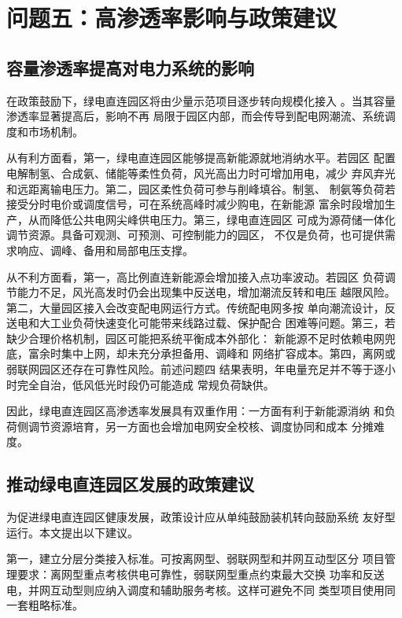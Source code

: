 \section{问题五：高渗透率影响与政策建议}

\subsection{容量渗透率提高对电力系统的影响}

在政策鼓励下，绿电直连园区将由少量示范项目逐步转向规模化接入
\cite{ndrc2025green-direct}。当其容量渗透率显著提高后，影响不再
局限于园区内部，而会传导到配电网潮流、系统调度和市场机制。

从有利方面看，第一，绿电直连园区能够提高新能源就地消纳水平。若园区
配置电解制氢、合成氨、储能等柔性负荷，风光高出力时可增加用电，减少
弃风弃光和远距离输电压力。第二，园区柔性负荷可参与削峰填谷。制氢、
制氨等负荷若接受分时电价或调度信号，可在系统高峰时减少购电，在新能源
富余时段增加生产，从而降低公共电网尖峰供电压力。第三，绿电直连园区
可成为源荷储一体化调节资源。具备可观测、可预测、可控制能力的园区，
不仅是负荷，也可提供需求响应、调峰、备用和局部电压支撑。

从不利方面看，第一，高比例直连新能源会增加接入点功率波动。若园区
负荷调节能力不足，风光高发时仍会出现集中反送电，增加潮流反转和电压
越限风险。第二，大量园区接入会改变配电网运行方式。传统配电网多按
单向潮流设计，反送电和大工业负荷快速变化可能带来线路过载、保护配合
困难等问题。第三，若缺少合理价格机制，园区可能把系统平衡成本外部化：
新能源不足时依赖电网兜底，富余时集中上网，却未充分承担备用、调峰和
网络扩容成本。第四，离网或弱联网园区还存在可靠性风险。前述问题四
结果表明，年电量充足并不等于逐小时完全自治，低风低光时段仍可能造成
常规负荷缺供。

因此，绿电直连园区高渗透率发展具有双重作用：一方面有利于新能源消纳
和负荷侧调节资源培育，另一方面也会增加电网安全校核、调度协同和成本
分摊难度。

\subsection{推动绿电直连园区发展的政策建议}

为促进绿电直连园区健康发展，政策设计应从单纯鼓励装机转向鼓励系统
友好型运行。本文提出以下建议。

第一，建立分层分类接入标准。可按离网型、弱联网型和并网互动型区分
项目管理要求：离网型重点考核供电可靠性，弱联网型重点约束最大交换
功率和反送电，并网互动型则应纳入调度和辅助服务考核。这样可避免不同
类型项目使用同一套粗略标准。

